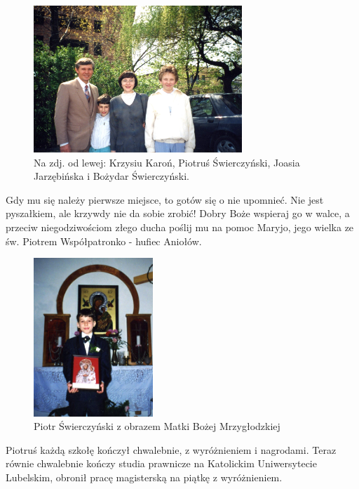 \begin{figure}[!h]
\begin{center}
\includegraphics[width=0.7\textwidth]{photo/piotr_swierczynski_chrzestni.jpg}
\caption[Piotr Świerczyński z chrzestnymi i bratem]{Na zdj. od lewej: Krzysiu Karoń, Piotruś Świerczyński, Joasia Jarzębińska i Bożydar Świerczyński.}
\end{center}
\end{figure}

Gdy mu się należy pierwsze miejsce, to gotów się o nie upomnieć. Nie jest pyszałkiem, ale krzywdy nie da sobie zrobić! Dobry Boże wspieraj go w walce, a przeciw niegodziwościom złego ducha poślij mu na pomoc Maryjo, jego wielka ze św. Piotrem Współpatronko - hufiec Aniołów.

\begin{figure}[!h]
\begin{center}
\includegraphics[width=0.4\textwidth]{photo/piotr_swierczynski_1.jpg}
\caption{Piotr Świerczyński z obrazem Matki Bożej Mrzygłodzkiej}
\end{center}
\end{figure}

Piotruś każdą szkołę kończył chwalebnie, z wyróżnieniem i nagrodami. Teraz równie chwalebnie kończy studia prawnicze na Katolickim Uniwersytecie Lubelskim, obronił pracę magisterską na piątkę z wyróżnieniem. 


